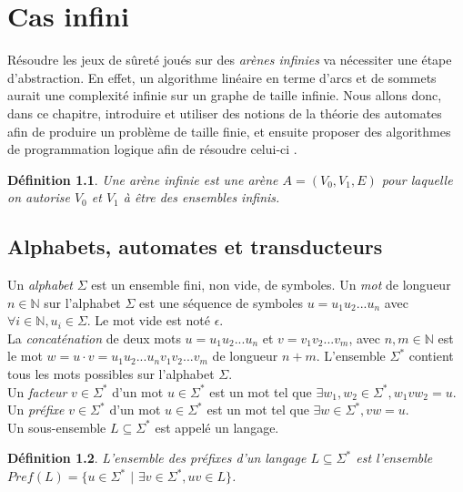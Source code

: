 \documentclass[12pt,a4paper,oneside,titlepage]{report}
\newtheorem{defi}{D\'efinition}[section]
\begin{document}
\chapter{Cas infini}
\renewcommand{\leftmark}{CHAPITRE \thechapter.~~Cas infini}
Résoudre les jeux de sûreté joués sur des \emph{arènes infinies} va nécessiter une étape d'abstraction. En effet, un algorithme linéaire en terme d'arcs et de sommets aurait une complexité infinie sur un graphe de taille infinie. Nous allons donc, dans ce chapitre, introduire et utiliser des notions de la théorie des automates afin de produire un problème de taille finie, et ensuite proposer des algorithmes de programmation logique afin de résoudre celui-ci \cite{NeiderAutomaton}.
\begin{defi}
Une \emph{arène infinie} est une arène $A=(V_0, V_1, E)$ pour laquelle on autorise $V_0$ et $V_1$ à être des ensembles infinis.
\end{defi}

\section{Alphabets, automates et transducteurs}
Un \emph{alphabet} $\Sigma$ est un ensemble fini, non vide, de symboles. Un \emph{mot} de longueur $n\in\mathbb{N}$ sur l'alphabet $\Sigma$ est une séquence de symboles $u=u_1u_2...u_n$ avec $\forall i\in\mathbb{N}, u_i\in \Sigma$. Le mot vide est noté $\epsilon$.\\
La \emph{concaténation} de deux mots $u=u_1u_2...u_n$ et $v=v_1v_2...v_m$, avec $n,m\in\mathbb{N}$ est le mot $w=u\cdot v=u_1u_2...u_nv_1v_2...v_m$ de longueur $n+m$. L'ensemble $\Sigma^*$ contient tous les mots possibles sur l'alphabet $\Sigma$.\\
Un \emph{facteur} $v\in\Sigma^*$ d'un mot $u\in\Sigma^*$ est un mot tel que $\exists w_1,w_2\in\Sigma^*,w_1vw_2=u$.\\
Un \emph{préfixe} $v\in\Sigma^*$ d'un mot $u\in\Sigma^*$ est un mot tel que $\exists w\in\Sigma^*, vw=u$.\\
Un sous-ensemble $L\subseteq \Sigma^*$ est appelé un langage.
\begin{defi}
L'ensemble des préfixes d'un langage $L\subseteq\Sigma^*$ est l'ensemble $Pref(L)=\{u\in\Sigma^*$ $|$ $\exists v\in\Sigma^*, uv\in L\}$.
\end{defi}
\end{document}
